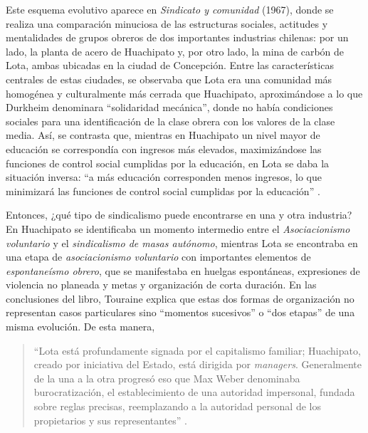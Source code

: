 Este esquema evolutivo aparece en \emph{Sindicato y comunidad} (1967), donde se realiza una comparación minuciosa de las estructuras sociales, actitudes y mentalidades de grupos obreros de dos importantes industrias chilenas: por un lado, la planta de acero de Huachipato y, por otro lado, la mina de carbón de Lota, ambas ubicadas en la ciudad de Concepción. Entre las características centrales de estas ciudades, se observaba que Lota era una comunidad más homogénea y culturalmente más cerrada que Huachipato, aproximándose a lo que Durkheim denominara \enquote{solidaridad mecánica}, donde no había condiciones sociales para una identificación de la clase obrera con los valores de la clase media. Así, se contrasta que, mientras en Huachipato un nivel mayor de educación se correspondía con ingresos más elevados, maximizándose las funciones de control social cumplidas por la educación, en Lota se daba la situación inversa: \enquote{a más educación corresponden menos ingresos, lo que minimizará las funciones de control social cumplidas por la educación} \parencite[180]{1651-DITELLA1967}.

Entonces, ¿qué tipo de sindicalismo puede encontrarse en una y otra industria? En Huachipato se identificaba un momento intermedio entre el \emph{Asociacionismo voluntario} y el \emph{sindicalismo de masas autónomo}, mientras Lota se encontraba en una etapa de \emph{asociacionismo voluntario} con importantes elementos de \emph{espontaneísmo obrero}, que se manifestaba en huelgas espontáneas, expresiones de violencia no planeada y metas y organización de corta duración. En las conclusiones del libro, Touraine explica que estas dos formas de organización no representan casos particulares sino \enquote{momentos sucesivos} o \enquote{dos etapas} de una misma evolución. De esta manera,

\begin{quote}
\enquote{Lota está profundamente signada por el capitalismo familiar; Huachipato, creado por iniciativa del Estado, está dirigida por \emph{managers}. Generalmente de la una a la otra progresó eso que Max Weber denominaba burocratización, el establecimiento de una autoridad impersonal, fundada sobre reglas precisas, reemplazando a la autoridad personal de los propietarios y sus representantes} \parencite[320]{1651-DITELLA1967}.
\end{quote}

